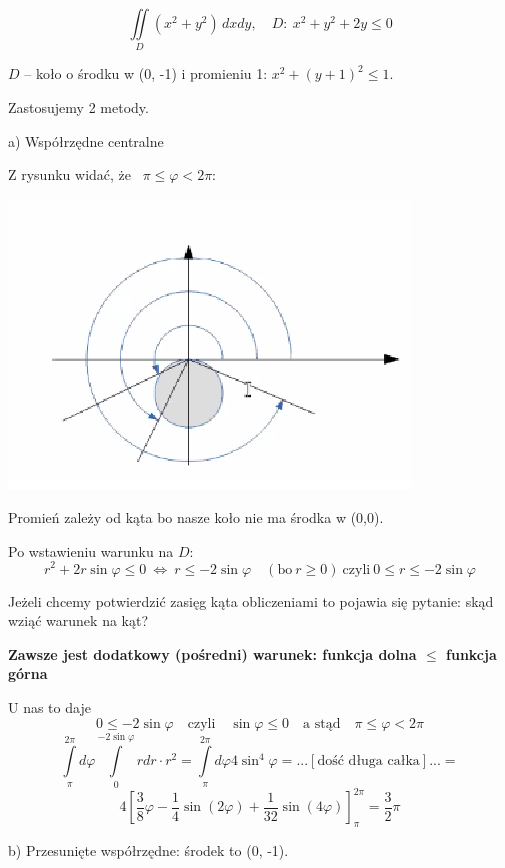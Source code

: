 \begin{przykladbig}
    \[ \iint\limits_D (x^2 + y^2) \, dxdy, \quad D: \ x^2 + y^2 + 2y \leq 0 \]

    $D$ -- koło o środku w (0, -1) i promieniu 1: $ x^2 + (y+1)^2 \leq 1 $.

    Zastosujemy 2 metody. \bigskip

    a) Współrzędne centralne

    Z rysunku widać, że \ $ \pi \leq \varphi < 2\pi $:

    \includegraphics[scale=0.5]{img/kolkakat.png}

    Promień zależy od kąta bo nasze koło nie ma środka w (0,0).

    Po wstawieniu warunku na $D$:
    \[ r^2 + 2r \sin \varphi \leq 0 \ \Leftrightarrow \ r \leq -2 \sin \varphi \quad (\textrm{bo} \ r \geq 0) \ \textrm{czyli} \ 0 \leq r \leq -2 \sin \varphi \]

    Jeżeli chcemy potwierdzić zasięg kąta obliczeniami to pojawia się pytanie: skąd wziąć warunek na kąt? \bigskip

    \textbf{Zawsze jest dodatkowy (pośredni) warunek: funkcja dolna $ \leq $ funkcja górna}

    U nas to daje
    \[ 0 \leq -2 \sin \varphi \quad \textrm{czyli} \quad \sin \varphi \leq 0 \quad \textrm{a stąd} \quad \pi \leq \varphi < 2 \pi \]
    \[ \int\limits_{\pi}^{2\pi} d \varphi \int\limits_{0}^{-2\sin\varphi} rdr \cdot r^2 = \int\limits_{\pi}^{2\pi} d \varphi 4 \sin^4 \varphi = 
    ...[\text{dość długa całka}]... = \]
    \[ 4 \left[ \frac{3}{8}\varphi - \frac{1}{4}\sin(2\varphi) + \frac{1}{32}\sin(4\varphi) \right]_{\pi}^{2\pi} = \frac{3}{2}\pi \]

    \bigskip
    b) Przesunięte współrzędne: środek to (0, -1).


\end{przykladbig}
